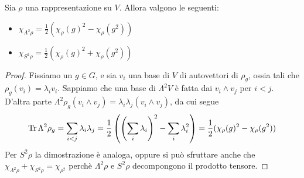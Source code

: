 \begin{myprop}
 Sia $\rho$ una rappresentazione su $V$. Allora valgono le seguenti:
 \begin{itemize}
  \item $\chi_{\Lambda^2 \rho} = \frac12 (\chi_\rho(g)^2 - \chi_\rho(g^2)) $
  \item $\chi_{S^2 \rho} = \frac12 (\chi_\rho(g)^2 + \chi_\rho(g^2)) $
 \end{itemize}
 
 \begin{proof}
  Fissiamo un $g \in G$, e sia $v_i$ una base di $V$ di autovettori di $\rho_g$, ossia tali che $\rho_g(v_i)=\lambda_iv_i$. Sappiamo che una base di $\Lambda^2 V$ è fatta dai $v_i \wedge v_j$ per $i<j$. D'altra parte $\Lambda^2\rho_g (v_i\wedge v_j) = \lambda_i\lambda_j (v_i \wedge v_j)$, da cui segue
  \[
   \operatorname{Tr} \Lambda^2\rho_g = \sum_{i<j}\lambda_i\lambda_j = \frac12\left(\left(\sum_i \lambda_i\right)^2 - \sum_i \lambda_i^2\right) = \frac12 (\chi_\rho(g)^2 - \chi_\rho(g^2))
  \]
  Per $S^2\rho$ la dimostrazione è analoga, oppure si può sfruttare anche che $\chi_{\Lambda^2\rho}+\chi_{S^2\rho}=\chi_{\rho^2}$ perchè $\Lambda^2\rho$ e $S^2\rho$ decompongono il prodotto tensore.

 \end{proof}


\end{myprop}
